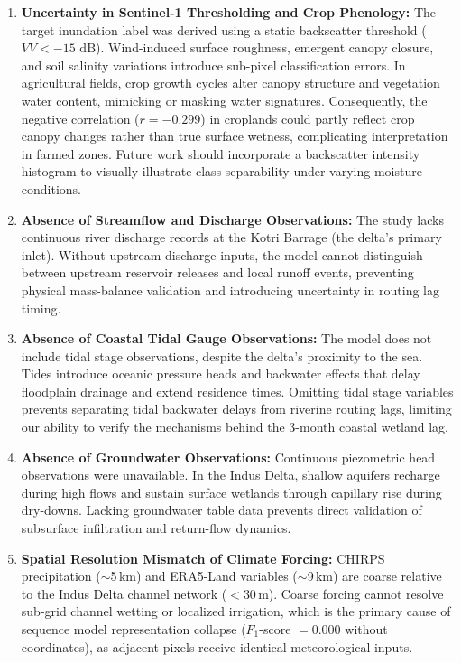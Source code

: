 \documentclass[12pt, a4paper]{article}
\begin{document}
\begin{enumerate}
    \item \textbf{Uncertainty in Sentinel-1 Thresholding and Crop Phenology:} The target inundation label was derived using a static backscatter threshold ($VV < -15\text{ dB}$). Wind-induced surface roughness, emergent canopy closure, and soil salinity variations introduce sub-pixel classification errors. In agricultural fields, crop growth cycles alter canopy structure and vegetation water content, mimicking or masking water signatures. Consequently, the negative correlation ($r = -0.299$) in croplands could partly reflect crop canopy changes rather than true surface wetness, complicating interpretation in farmed zones. Future work should incorporate a backscatter intensity histogram to visually illustrate class separability under varying moisture conditions.
    \item \textbf{Absence of Streamflow and Discharge Observations:} The study lacks continuous river discharge records at the Kotri Barrage (the delta's primary inlet). Without upstream discharge inputs, the model cannot distinguish between upstream reservoir releases and local runoff events, preventing physical mass-balance validation and introducing uncertainty in routing lag timing.
    \item \textbf{Absence of Coastal Tidal Gauge Observations:} The model does not include tidal stage observations, despite the delta's proximity to the sea. Tides introduce oceanic pressure heads and backwater effects that delay floodplain drainage and extend residence times. Omitting tidal stage variables prevents separating tidal backwater delays from riverine routing lags, limiting our ability to verify the mechanisms behind the 3-month coastal wetland lag.
    \item \textbf{Absence of Groundwater Observations:} Continuous piezometric head observations were unavailable. In the Indus Delta, shallow aquifers recharge during high flows and sustain surface wetlands through capillary rise during dry-downs. Lacking groundwater table data prevents direct validation of subsurface infiltration and return-flow dynamics.
    \item \textbf{Spatial Resolution Mismatch of Climate Forcing:} CHIRPS precipitation ($\sim$5\,km) and ERA5-Land variables ($\sim$9\,km) are coarse relative to the Indus Delta channel network ($<$30\,m). Coarse forcing cannot resolve sub-grid channel wetting or localized irrigation, which is the primary cause of sequence model representation collapse ($F_1$-score $= 0.000$ without coordinates), as adjacent pixels receive identical meteorological inputs.

\end{enumerate}
\end{document}

